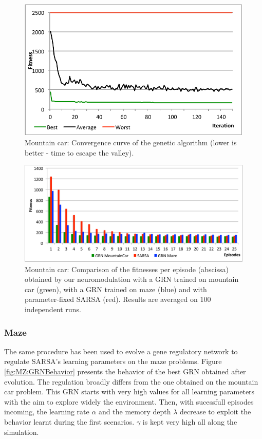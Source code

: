 \begin{figure}
\center
\includegraphics[width=0.75\linewidth]{MC_convergence.pdf}
\caption{Mountain car: Convergence curve of the genetic algorithm (lower is better - time to escape the valley).}\label{fig:MC:Convergence}
\end{figure}

\begin{figure}
\center
\includegraphics[width=\linewidth]{MC_GRNvsSARSA.pdf}
\caption{Mountain car: Comparison of the fitnesses per episode (abscissa) obtained by our neuromodulation with a GRN trained on mountain car (green), with a GRN trained on maze (blue) and with parameter-fixed SARSA (red). Results are averaged on 100 independent runs.}\label{fig:MC:GRNvsSARSA}
\end{figure}

\subsubsection{Maze}
The same procedure has been used to evolve a gene regulatory network to regulate SARSA's learning parameters on the maze problems. Figure \ref{fig:MZ:GRNBehavior} presents the behavior of the best GRN obtained after evolution. The regulation broadly differs from the one obtained on the mountain car problem. This GRN starts with very high values for all learning parameters with the aim to explore widely the environment. Then, with sucessfull episodes incoming, the learning rate $\alpha$ and the memory depth $\lambda$ decrease to exploit the behavior learnt during the first scenarios. $\gamma$ is kept very high all along the simulation.

